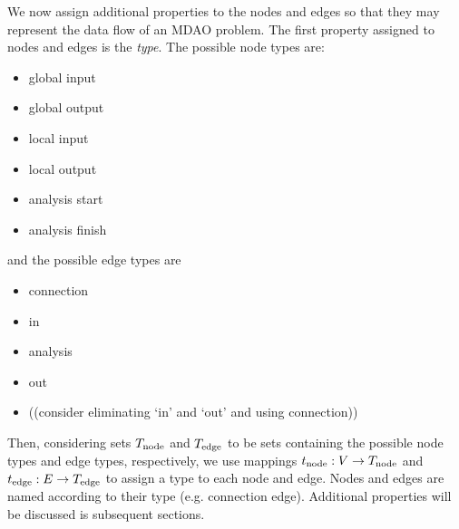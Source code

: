 We now assign additional properties to the nodes and edges so that they may represent the data flow of an MDAO problem. 
The first property assigned to nodes and edges is the \emph{type}. The possible node types are:
\begin{itemize}
\item global input
\item global output
\item local input
\item local output
\item analysis start
\item analysis finish
\end{itemize}
and the possible edge types are
\begin{itemize}
\item connection
\item in
\item analysis
\item out
\item ((consider eliminating `in' and `out' and using connection))
\end{itemize}
Then, considering sets $T_\textrm{node}$ and $T_\textrm{edge}$ to be sets containing the possible node types and edge types, respectively, we use mappings $t_\textrm{node}:V \to T_\textrm{node}$ and $t_\textrm{edge}:E \to T_\textrm{edge}$ to assign a type to each node and edge. Nodes and edges are named according to their type (e.g. connection edge). Additional properties will be discussed is subsequent sections.


